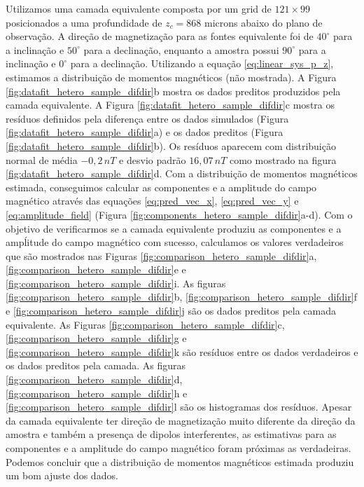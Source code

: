 Utilizamos uma camada equivalente composta por um grid de $121 \times 99$ posicionados a uma profundidade de $z_c = 868$ microns abaixo do plano de observação. 
A direção de magnetização para as fontes equivalente foi de $40^\circ$ para a inclinação e $50^\circ$ para a declinação, enquanto a amostra possui $90^\circ$ para a inclinação e $0^\circ$ para a declinação. 
Utilizando a equação \ref{eq:linear_sys_p_z}, estimamos a distribuição de momentos magnéticos (não mostrada). 
A Figura \ref{fig:datafit_hetero_sample_difdir}b mostra os dados preditos produzidos pela camada equivalente. 
A Figura \ref{fig:datafit_hetero_sample_difdir}c mostra os resíduos definidos pela diferença entre os dados simulados (Figura \ref{fig:datafit_hetero_sample_difdir}a) e os dados preditos (Figura \ref{fig:datafit_hetero_sample_difdir}b). Os resíduos aparecem com distribuição normal de média $-0,2 \, nT$ e desvio padrão $16,07 \, nT$ como mostrado na figura \ref{fig:datafit_hetero_sample_difdir}d. Com a distribuição de momentos magnéticos estimada, conseguimos calcular as componentes e a amplitude do campo magnético através das equações \ref{eq:pred_vec_x}, \ref{eq:pred_vec_y} e \ref{eq:amplitude_field} (Figura \ref{fig:components_hetero_sample_difdir}a-d). Com o objetivo de verificarmos se a camada equivalente produziu as componentes e a ampĺitude do campo magnético com sucesso, calculamos os valores verdadeiros que são mostrados nas Figuras \ref{fig:comparison_hetero_sample_difdir}a, \ref{fig:comparison_hetero_sample_difdir}e e \ref{fig:comparison_hetero_sample_difdir}i. As figuras \ref{fig:comparison_hetero_sample_difdir}b, \ref{fig:comparison_hetero_sample_difdir}f e \ref{fig:comparison_hetero_sample_difdir}j são os dados preditos pela camada equivalente. 
As Figuras \ref{fig:comparison_hetero_sample_difdir}c, \ref{fig:comparison_hetero_sample_difdir}g e \ref{fig:comparison_hetero_sample_difdir}k são resíduos entre os dados verdadeiros e os dados preditos pela camada. As figuras \ref{fig:comparison_hetero_sample_difdir}d, \ref{fig:comparison_hetero_sample_difdir}h e \ref{fig:comparison_hetero_sample_difdir}l são os histogramas dos resíduos. Apesar da camada equivalente ter direção de magnetização muito diferente da direção da amostra e também a presença de dipolos interferentes, as estimativas para as componentes e a amplitude do campo magnético foram próximas as verdadeiras. Podemos concluir que a distribuição de momentos magnéticos estimada produziu um bom ajuste dos dados.   


